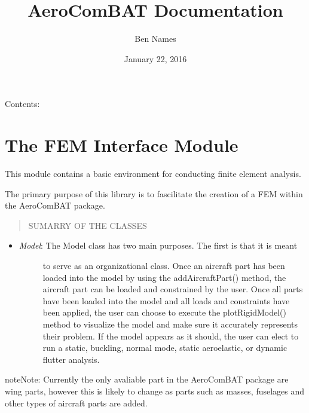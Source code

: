 \documentclass[letterpaper,10pt,english]{sphinxmanual}
\title{AeroComBAT Documentation}
\date{January 22, 2016}
\author{Ben Names}
\begin{document}
\maketitle
\tableofcontents
{}\label{index::doc}


Contents:


\chapter{The FEM Interface Module}
\label{FEM:welcome-to-aerocombat-s-documentation}\label{FEM:module-AeroComBAT.FEM}\label{FEM::doc}\label{FEM:the-fem-interface-module}
This module contains a basic environment for conducting finite element analysis.

The primary purpose of this library is to fascilitate the creation of a FEM
within the AeroComBAT package.
\begin{quote}\begin{description}
\item[{SUMARRY OF THE CLASSES}] \leavevmode
\end{description}\end{quote}
\begin{itemize}
\item {} \begin{description}
\item[{\emph{Model}: The Model class has two main purposes. The first is that it is meant}] \leavevmode
to serve as an organizational class. Once an aircraft part has been loaded
into the model by using the addAircraftPart() method, the aircraft part
can be loaded and constrained by the user. Once all parts have been loaded
into the model and all loads and constraints have been applied, the user
can choose to execute the plotRigidModel() method to visualize the model
and make sure it accurately represents their problem. If the model appears
as it should, the user can elect to run a static, buckling, normal mode,
static aeroelastic, or dynamic flutter analysis.

\end{description}

\end{itemize}

\begin{notice}{note}{Note:}
Currently the only avaliable part in the AeroComBAT package are wing
parts, however this is likely to change as parts such as masses, fuselages
and other types of aircraft parts are added.
\end{notice}
\label{FEM:module-AeroComBAT.FEM}
\end{document}
